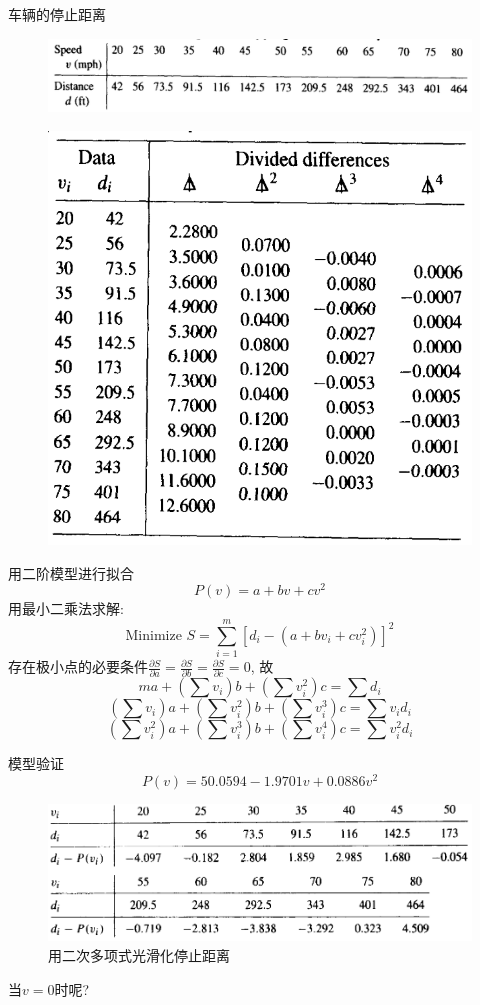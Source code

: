 \documentclass[UTF8]{ctexbeamer}
\begin{document}
\begin{frame}{车辆的停止距离}
  \begin{figure}
    \centering{}
    \includegraphics[width=.7\textwidth{}]{car-tab.png}
  \end{figure}
  \begin{figure}
    \centering{}
    \includegraphics[width=.5\textwidth{}]{car-dif.png}
  \end{figure}
\end{frame}

\begin{frame}{用二阶模型进行拟合}
  \[
  P(v) = a + bv + cv^2
  \]
  用最小二乘法求解:
  \[
  \text{Minimize } S = \sum_{i=1}^m [d_i - (a + bv_i + cv_i^2)]^2
  \]
  存在极小点的必要条件$\frac{\partial S}{\partial a} = \frac{\partial S}{\partial b} = \frac{\partial S}{\partial c} = 0$, 故
  \[
  ma + (\sum v_i)b + (\sum v_i^2)c = \sum d_i
  \]
  \[
  (\sum v_i)a + (\sum v_i^2)b + (\sum v_i^3)c = \sum v_id_i
  \]
  \[
  (\sum v_i^2)a + (\sum v_i^3)b + (\sum v_i^4)c = \sum v_i^2d_i
  \]

\end{frame}

\begin{frame}{模型验证}
  \[
  P(v) = 50.0594 - 1.9701v + 0.0886v^2
  \]

  \begin{figure}
    \centering{}
    \includegraphics[width=.7\textwidth{}]{car-comp.png}
    \caption{用二次多项式光滑化停止距离}
  \end{figure}

  当$v = 0$时呢?

\end{frame}
\end{document}
